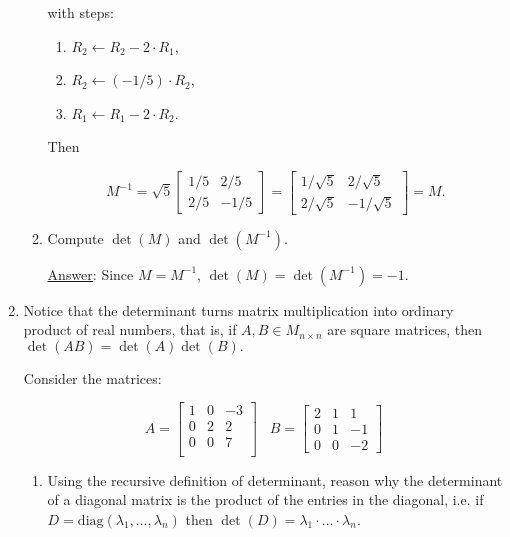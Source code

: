 \documentclass[]{book}
\theoremstyle{definition}
\newcommand\ans{\underline{Answer}: }
\begin{document}
\begin{enumerate}
\begin{enumerate}
with steps: 
\begin{enumerate}
\item $R_2 \leftarrow R_2 - 2\cdot R_1$, 
\item $R_2 \leftarrow (-1/5) \cdot R_2$,
\item $R_1 \leftarrow R_1 - 2\cdot R_2$.
\end{enumerate}

Then

\[
   M^{-1}=\sqrt{5}
  \begin{bmatrix}
   1/5 & 2/5 \\
   2/5 & -1/5 
  \end{bmatrix} =
  \begin{bmatrix}
   1/\sqrt{5} & 2/\sqrt{5} \\
   2/\sqrt{5} & -1/\sqrt{5}
  \end{bmatrix} = M.
\]

\item Compute $\det(M)$ and $\det(M^{-1})$.

\ans Since $M = M^{-1}$, $\det(M) = \det(M^{-1}) = -1$.


\end{enumerate}



\item Notice that the determinant turns matrix multiplication into ordinary product of real numbers, that is, 
if $A, B\in M_{n\times n}$ are square matrices, then $\det(AB)=\det(A)\det(B).$ 

Consider the matrices:

\[
   A=
  \left[ 
  {\begin{array}{ccc}
  1 & 0 & -3 \\
  0 & 2 & 2 \\
  0 & 0 & 7 \\
  \end{array} } \right]
\;\;\;
   B=
  \left[
  {\begin{array}{ccc}
  2 & 1 & 1 \\
  0 & 1 & -1 \\
  0 & 0 & -2
  \end{array} } 
   \right]
\]


\begin{enumerate}
\item Using the recursive definition of determinant, reason why the determinant of a diagonal matrix is the product
of the entries in the diagonal, i.e. if $D=\textrm{diag}(\lambda_1, \ldots, \lambda_n)$ then $\det(D) = \lambda_1 \cdot \ldots \cdot \lambda_n$.


\end{enumerate}
\end{enumerate}
\end{document}
